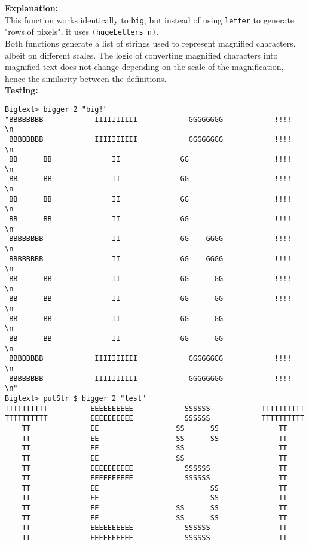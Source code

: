 \documentclass[11pt]{article}
\begin{document}
{\textbf{Explanation:}\\
This function works identically to {\verb|big|}, but instead of using {\verb|letter|} to generate "rows of pixels", it uses {\verb|(hugeLetters n)|}.\\

 Both functions generate a list of strings used to represent magnified characters, albeit on different scales. The logic of converting magnified characters into magnified text does not change depending on the scale of the magnification, hence the similarity between the definitions.\\

\newpage
\textbf{Testing:}
\begin{verbatim}
Bigtext> bigger 2 "big!"
"BBBBBBBB            IIIIIIIIII            GGGGGGGG            !!!!    \n
 BBBBBBBB            IIIIIIIIII            GGGGGGGG            !!!!    \n
 BB      BB              II              GG                    !!!!    \n
 BB      BB              II              GG                    !!!!    \n
 BB      BB              II              GG                    !!!!    \n
 BB      BB              II              GG                    !!!!    \n
 BBBBBBBB                II              GG    GGGG            !!!!    \n
 BBBBBBBB                II              GG    GGGG            !!!!    \n
 BB      BB              II              GG      GG            !!!!    \n
 BB      BB              II              GG      GG            !!!!    \n
 BB      BB              II              GG      GG                    \n
 BB      BB              II              GG      GG                    \n
 BBBBBBBB            IIIIIIIIII            GGGGGGGG            !!!!    \n
 BBBBBBBB            IIIIIIIIII            GGGGGGGG            !!!!    \n"
Bigtext> putStr $ bigger 2 "test"
TTTTTTTTTT          EEEEEEEEEE            SSSSSS            TTTTTTTTTT
TTTTTTTTTT          EEEEEEEEEE            SSSSSS            TTTTTTTTTT
    TT              EE                  SS      SS              TT    
    TT              EE                  SS      SS              TT    
    TT              EE                  SS                      TT    
    TT              EE                  SS                      TT    
    TT              EEEEEEEEEE            SSSSSS                TT    
    TT              EEEEEEEEEE            SSSSSS                TT    
    TT              EE                          SS              TT    
    TT              EE                          SS              TT    
    TT              EE                  SS      SS              TT    
    TT              EE                  SS      SS              TT    
    TT              EEEEEEEEEE            SSSSSS                TT    
    TT              EEEEEEEEEE            SSSSSS                TT    


\end{verbatim}}
\end{document}
